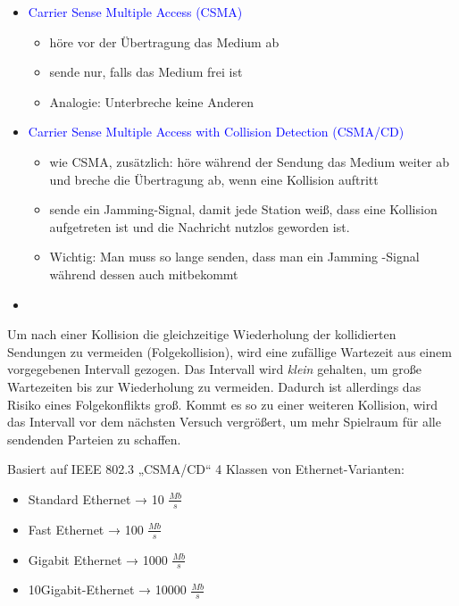 \begin{itemize}
    \item \textcolor{blue}{Carrier Sense Multiple Access (CSMA)}
    \begin{itemize}
        \item höre vor der Übertragung das Medium ab
        \item sende nur, falls das Medium frei ist
        \item Analogie: Unterbreche keine Anderen
    \end{itemize}
    \item \textcolor{blue}{Carrier Sense Multiple Access with Collision Detection (CSMA/CD)}
    \begin{itemize}
        \item wie CSMA, zusätzlich: höre während der Sendung das Medium weiter ab und breche die Übertragung ab, wenn eine Kollision auftritt
        \item sende ein Jamming-Signal, damit jede Station weiß, dass eine Kollision aufgetreten ist und die Nachricht nutzlos geworden ist.
        \item Wichtig: Man muss so lange senden, dass man ein Jamming -Signal während dessen auch mitbekommt
    \end{itemize}
\end{itemize}

\begin{itemize}
    \item
\end{itemize}

Um nach einer Kollision die gleichzeitige Wiederholung der kollidierten Sendungen
zu vermeiden (Folgekollision), wird eine zufällige Wartezeit aus einem vorgegebenen
Intervall gezogen.
Das Intervall wird \textit{klein} gehalten, um große Wartezeiten
bis zur Wiederholung zu vermeiden.
Dadurch ist allerdings das Risiko eines
Folgekonflikts groß.
Kommt es so zu einer weiteren Kollision, wird das Intervall
vor dem nächsten Versuch vergrößert, um mehr Spielraum für alle sendenden
Parteien zu schaffen.

Basiert auf IEEE 802.3 „CSMA/CD“
4 Klassen von Ethernet-Varianten:
\begin{itemize}
    \item Standard Ethernet → 10 $\frac{Mb}{s}$
    \item Fast Ethernet → 100 $\frac{Mb}{s}$
    \item Gigabit Ethernet → 1000 $\frac{Mb}{s}$
    \item 10Gigabit-Ethernet → 10000 $\frac{Mb}{s}$
\end{itemize}

